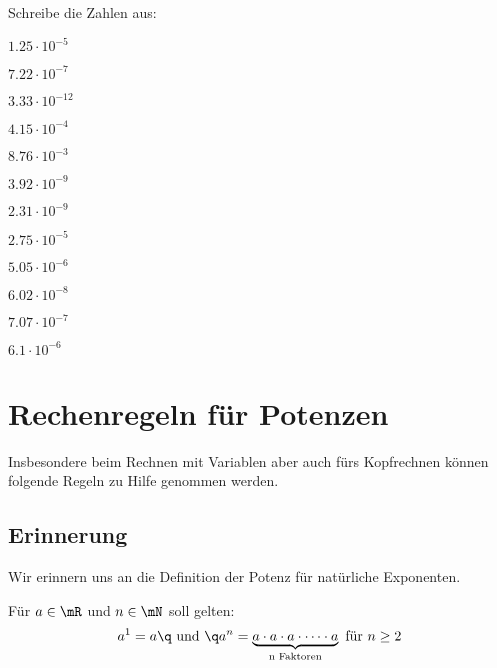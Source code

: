 \documentclass[
twoside,%
ngerman,%
headsepline%
11pt]%
{article}
\begin{document}
\begin{ueb}[float]
  Schreibe die Zahlen aus:
  \\[2.5ex]\hspace*{2.7ex}
  \begin{minipage}{0.4\textwidth}
    \begin{enumeratea}
      \item $1.25\cdot10^{-5}$
      \item $7.22\cdot10^{-7}$
      \item $3.33\cdot10^{-12}$
      \item $4.15\cdot10^{-4}$
      \item $8.76\cdot10^{-3}$
      \item $3.92\cdot10^{-9}$\\[1ex]
    \end{enumeratea}
  \end{minipage}
  \begin{minipage}{0.23\textwidth}
    \begin{enumeratea}\addtocounter{enumi}{6}
      \item $2.31\cdot10^{-9}$
      \item $2.75\cdot10^{-5}$
      \item $5.05\cdot10^{-6}$
      \item $6.02\cdot10^{-8}$
      \item $7.07\cdot10^{-7}$
      \item $6.1\cdot10^{-6}$\\[1ex]
    \end{enumeratea}
  \end{minipage}
\end{ueb}

\section{Rechenregeln f\"ur Potenzen}
Insbesondere beim Rechnen mit Variablen aber auch f\"urs Kopfrechnen k\"onnen folgende Regeln zu Hilfe genommen werden.

\subsection{Erinnerung}
Wir erinnern uns an die Definition der Potenz f\"ur nat\"urliche Exponenten.

\begin{defn}
F\"ur $a\in\mR$ und $n\in\mN$ soll gelten:
$$a^1=a\q\text{ und }\q a^n=\underbrace{a\cdot a\cdot a\cdot\dots\cdot a}_{\text{n Faktoren}}\text{ f\"ur }n\geq2$$
\end{defn}
\end{document}
